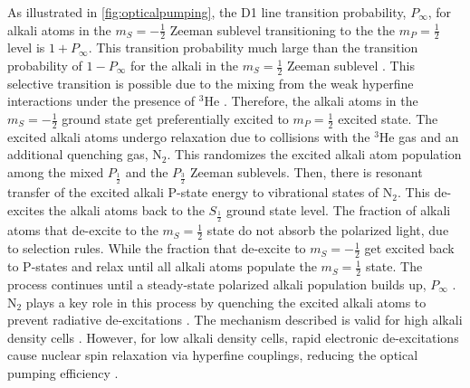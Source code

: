 As illustrated in \cref{fig:opticalpumping}, the D1 line transition probability, $P_{\infty}$, for alkali atoms in the $m_S=-\frac{1}{2}$ Zeeman sublevel transitioning to the the $m_P=\frac{1}{2}$ level is $1+P_{\infty}$. This transition probability much large than the transition probability of $1-P_{\infty}$ for the alkali in the $m_S=\frac{1}{2}$ Zeeman sublevel \cite{Gentile2017, Happer1987, Lancor2010}. This selective transition is possible due to the mixing from the weak hyperfine interactions under the presence of $^3$He \cite{Gentile2017, Happer1987}. Therefore, the alkali atoms in the $m_S=-\frac{1}{2}$ ground state get preferentially excited to $m_P=\frac{1}{2}$ excited state. The excited alkali atoms undergo relaxation due to collisions with the $^3$He gas and an additional quenching gas, N$_2$. This randomizes the excited alkali atom population among the mixed $P_{\frac{1}{2}}$ and the $P_{\frac{3}{2}}$ Zeeman sublevels. Then, there is resonant transfer of the excited alkali P-state energy to vibrational states of N$_2$. This de-excites the alkali atoms back to the $S_{\frac{1}{2}}$ ground state level. The fraction of alkali atoms that de-excite to the $m_S=\frac{1}{2}$ state do not absorb the polarized light, due to selection rules. While the fraction that de-excite to $m_S=-\frac{1}{2}$ get excited back to P-states and relax until all alkali atoms populate the $m_S=\frac{1}{2}$ state. The process continues until a steady-state polarized alkali population builds up, $P_{\infty}$ \cite{Lancor2010}. N$_2$ plays a key role in this process by quenching the excited alkali atoms to prevent radiative de-excitations \cite{Lancor2010}. The mechanism described is valid for high alkali density cells \cite{Gentile2017, Walker1997, Happer1987}. However, for low alkali density cells, rapid electronic de-excitations cause nuclear spin relaxation via hyperfine couplings, reducing the optical pumping efficiency \cite{Lancor2010}.

